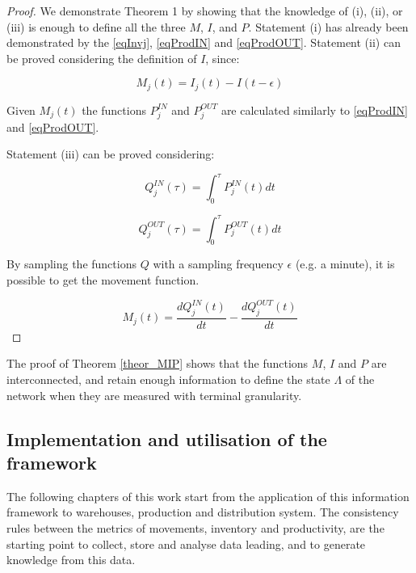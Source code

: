 \begin{proof}

We demonstrate Theorem 1 by showing that the knowledge of (i), (ii), or (iii) is enough to define all the three $M$, $I$, and $P$. Statement (i) has already been demonstrated by the \ref{eqInvj}, \ref{eqProdIN} and \ref{eqProdOUT}. Statement (ii) can be proved considering the definition of $I$, since:


\begin{equation}
M_j(t)=I_j(t)-I(t-\epsilon) 
\label{eqThPart2}
\end{equation}

Given $M_j (t)$ the functions $P_j^{IN}$ and $P_j^{OUT}$ are calculated similarly to \ref{eqProdIN} and \ref{eqProdOUT}. \par
Statement (iii) can be proved considering:

\begin{equation}
Q_j^{IN} (\tau)=\int_0^\tau P_j^{IN}(t)dt
\label{eqThPart3IN}
\end{equation}

\begin{equation}
Q_j^{OUT} (\tau)=\int_0^\tau P_j^{OUT}(t)dt
\label{eqThPart3OUT}
\end{equation}

By sampling the functions $Q$ with a sampling frequency $\epsilon$ (e.g. a minute), it is possible to get the movement function.

\begin{equation}
M_j(t)=\frac{dQ_j^{IN}(t)}{dt} - \frac{dQ_j^{OUT}(t)}{dt}
\label{eqThPart3Mov}
\end{equation}

\end{proof}

The proof of Theorem \ref{theor_MIP} shows that the functions $M$, $I$ and $P$ are interconnected, and retain enough information to define the state $\Lambda$ of the network when they are measured with terminal granularity. 

\subsection{Implementation and utilisation of the framework}
The following chapters of this work start from the application of this information framework to warehouses, production and distribution system. The consistency rules between the metrics of movements, inventory and productivity, are the starting point to collect, store and analyse data leading, and to generate knowledge from this data.\par

